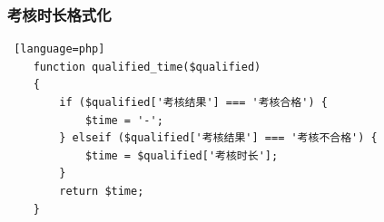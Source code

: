 \documentclass[winfonts,UTF8,a4paper]{ctexart}
\begin{document}
\subsubsection*{考核时长格式化}
\begin{lstlisting} [language=php]
	function qualified_time($qualified)
	{
		if ($qualified['考核结果'] === '考核合格') {
			$time = '-';
		} elseif ($qualified['考核结果'] === '考核不合格') {
			$time = $qualified['考核时长'];
		}
		return $time;
	}
\end{lstlisting}


    
    
\end{document}
